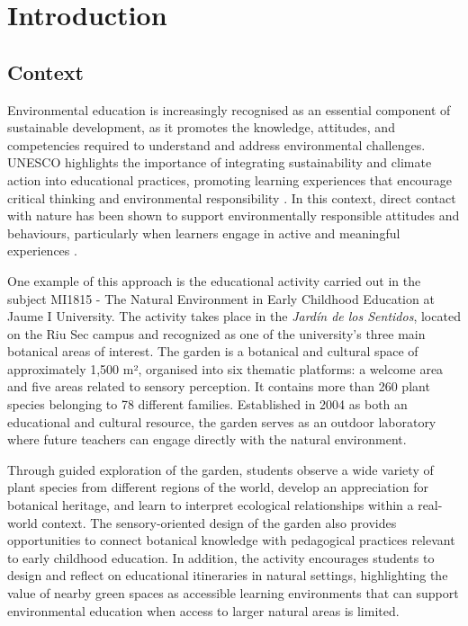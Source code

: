 \chapter{Introduction}

\section{Context}
Environmental education is increasingly recognised as an essential component of sustainable development, as it promotes the knowledge, attitudes, and competencies required to understand and address environmental challenges. UNESCO highlights the importance of integrating sustainability and climate action into educational practices, promoting learning experiences that encourage critical thinking and environmental responsibility \cite{unesco_2024}. In this context, direct contact with nature has been shown to support environmentally responsible attitudes and behaviours, particularly when learners engage in active and meaningful experiences \cite{rosa2018nature}.

One example of this approach is the educational activity carried out in the subject MI1815 - The Natural Environment in Early Childhood Education at Jaume I University. The activity takes place in the \textit{Jardín de los Sentidos}, located on the Riu Sec campus and recognized as one of the university’s three main botanical areas of interest. The garden is a botanical and cultural space of approximately 1,500 m², organised into six thematic platforms: a welcome area and five areas related to sensory perception. It contains more than 260 plant species belonging to 78 different families. Established in 2004 as both an educational and cultural resource, the garden serves as an outdoor laboratory where future teachers can engage directly with the natural environment.

Through guided exploration of the garden, students observe a wide variety of plant species from different regions of the world, develop an appreciation for botanical heritage, and learn to interpret ecological relationships within a real-world context. The sensory-oriented design of the garden also provides opportunities to connect botanical knowledge with pedagogical practices relevant to early childhood education. In addition, the activity encourages students to design and reflect on educational itineraries in natural settings, highlighting the value of nearby green spaces as accessible learning environments that can support environmental education when access to larger natural areas is limited.


